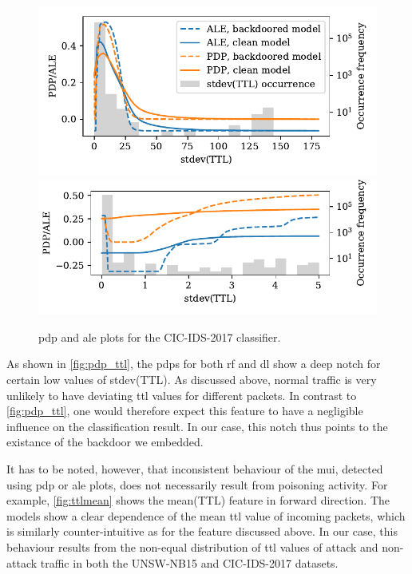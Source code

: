 \documentclass[10pt,sigconf,letterpaper,dvipsnames]{acmart}
\begin{document}
\begin{figure}[t]
\includegraphics[width=\columnwidth]{figures/pdpale2017nn.pdf}
\includegraphics[width=\columnwidth]{figures/pdpale2017nn_zoom.pdf}
\caption{\gls{pdp} and \gls{ale} plots for the CIC-IDS-2017 classifier.}
\label{fig:pdp_ttl}
\end{figure}

As shown in \autoref{fig:pdp_ttl}, the \glspl{pdp} for both \gls{rf} and \gls{dl} show a deep notch for certain low values of stdev(TTL). As discussed above, normal traffic is very unlikely to have deviating \gls{ttl} values for different packets. In contrast to \autoref{fig:pdp_ttl}, one would therefore expect this feature to have a negligible influence on the classification result. In our case, this notch thus points to the existance of the backdoor we embedded.


It has to be noted, however, that inconsistent behaviour of the \gls{mui}, detected using \gls{pdp} or \gls{ale} plots, does not necessarily result from poisoning activity.  For example, \autoref{fig:ttlmean} shows the mean(TTL) feature in forward direction. The models show a clear dependence of the mean \gls{ttl} value of incoming packets, which is similarly counter-intuitive as for the feature discussed above. In our case, this behaviour results from the non-equal distribution of \gls{ttl} values of attack and non-attack traffic in both the UNSW-NB15 and CIC-IDS-2017 datasets. 
\end{document}
